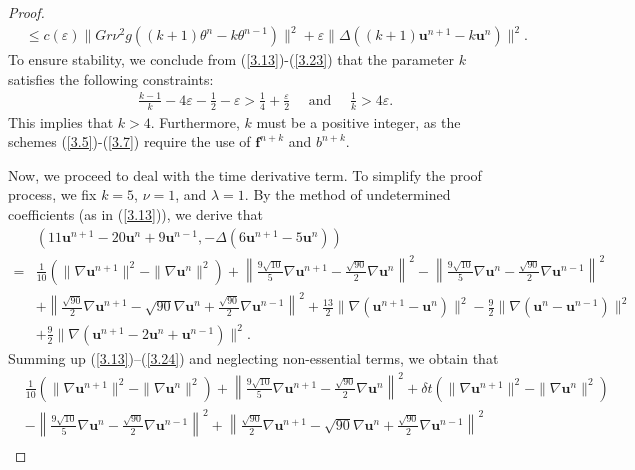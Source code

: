 \documentclass[10pt,a4paper]{amsart}
\theoremstyle{thmm}
\begin{document}
\begin{proof}
\begin{align}
			&\leq c(\varepsilon)\|Gr\nu^2g((k+1)\theta^n-k\theta^{n-1})\|^2+\varepsilon\|\Delta((k+1)\bm{u}^{n+1}-k\bm{u}^n)\|^2.
		\end{align}
		To ensure stability, we conclude from (\ref{3.13})-(\ref{3.23}) that the parameter \( k \) satisfies the following constraints:
		\begin{align}
			&\frac{k-1}{k}-4\varepsilon-\frac{1}{2}-\varepsilon>\frac{1}{4}+\frac{\varepsilon}{2}  \quad \text{ and }  \quad \frac{1}{k}>4\varepsilon.\nonumber
		\end{align}
		This implies that \( k > 4 \). Furthermore, $k$ must be a positive integer, as the schemes (\ref{3.5})-(\ref{3.7}) require the use of \(\bm{f}^{n+k}\) and \(b^{n+k}\).
		
		Now, we proceed to deal with the time derivative term. To simplify the proof process, we fix \( k = 5 \), \( \nu = 1 \), and \( \lambda = 1 \). By the method of undetermined coefficients (as in (\ref{3.13})), we derive that
		\begin{align}\label{3.24}
			&(11\bm{u}^{n+1} - 20\bm{u}^n + 9\bm{u}^{n-1}, -\Delta(6\bm{u}^{n+1} - 5\bm{u}^n)) \nonumber\\
			\nonumber
			= & \frac{1}{10} \left( \|\nabla \bm{u}^{n+1}\|^2 - \|\nabla \bm{u}^n\|^2 \right) + \left\| \frac{9\sqrt{10}}{5} \nabla \bm{u}^{n+1} - \frac{\sqrt{90}}{2} \nabla \bm{u}^n \right\|^2 - \left\| \frac{9\sqrt{10}}{5} \nabla \bm{u}^n - \frac{\sqrt{90}}{2} \nabla \bm{u}^{n-1} \right\|^2 \\
			\nonumber
			&  + \left\| \frac{\sqrt{90}}{2} \nabla \bm{u}^{n+1} - \sqrt{90} \nabla \bm{u}^n + \frac{\sqrt{90}}{2} \nabla \bm{u}^{n-1} \right\|^2  + \frac{13}{2} \|\nabla(\bm{u}^{n+1} - \bm{u}^n)\|^2 - \frac{9}{2} \|\nabla(\bm{u}^n - \bm{u}^{n-1})\|^2\nonumber\\
			& + \frac{9}{2} \|\nabla(\bm{u}^{n+1} - 2\bm{u}^n + \bm{u}^{n-1})\|^2.
		\end{align}
		Summing up (\ref{3.13})–(\ref{3.24}) and  neglecting non-essential terms, we obtain that
		\begin{align}\label{3.25}
			& \frac{1}{10} \left( \|\nabla \bm{u}^{n+1}\|^2 - \|\nabla \bm{u}^n\|^2 \right) + \left\| \frac{9\sqrt{10}}{5} \nabla \bm{u}^{n+1} - \frac{\sqrt{90}}{2} \nabla \bm{u}^n \right\|^2+\delta t(\|\nabla\bm{u}^{n+1}\|^2-\|\nabla\bm{u}^{n}\|^2) \nonumber\\
			&   - \left\| \frac{9\sqrt{10}}{5} \nabla \bm{u}^n - \frac{\sqrt{90}}{2} \nabla \bm{u}^{n-1} \right\|^2 + \left\| \frac{\sqrt{90}}{2} \nabla \bm{u}^{n+1} - \sqrt{90} \nabla \bm{u}^n + \frac{\sqrt{90}}{2} \nabla \bm{u}^{n-1} \right\|^2 \nonumber\\

\end{align}
\end{proof}
\end{document}
